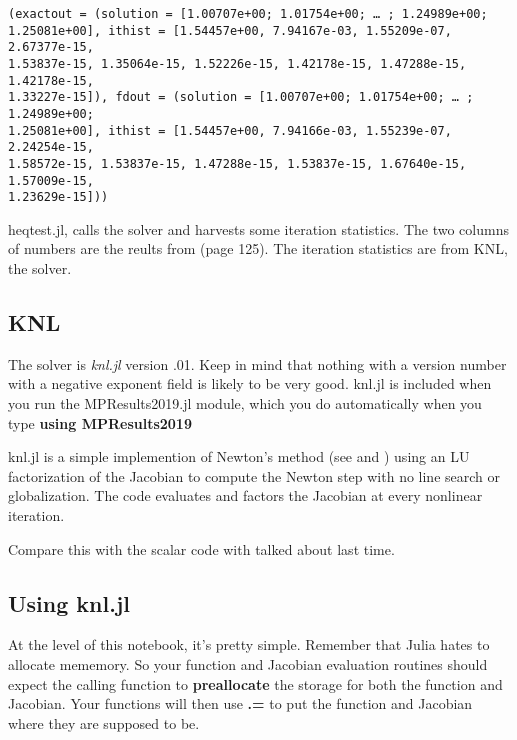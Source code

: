 \documentclass[11pt]{article}
\newcommand{\prompt}[4]{
        \llap{{\color{#2}[#3]: #4}}\vspace{-1.25em}
    }
\begin{document}
            \begin{tcolorbox}[breakable, boxrule=.5pt, size=fbox, pad at break*=1mm, opacityfill=0]
\prompt{Out}{outcolor}{9}{\hspace{3.5pt}}
\begin{Verbatim}[commandchars=\\\{\}]
(exactout = (solution = [1.00707e+00; 1.01754e+00; … ; 1.24989e+00;
1.25081e+00], ithist = [1.54457e+00, 7.94167e-03, 1.55209e-07, 2.67377e-15,
1.53837e-15, 1.35064e-15, 1.52226e-15, 1.42178e-15, 1.47288e-15, 1.42178e-15,
1.33227e-15]), fdout = (solution = [1.00707e+00; 1.01754e+00; … ; 1.24989e+00;
1.25081e+00], ithist = [1.54457e+00, 7.94166e-03, 1.55239e-07, 2.24254e-15,
1.58572e-15, 1.53837e-15, 1.47288e-15, 1.53837e-15, 1.67640e-15, 1.57009e-15,
1.23629e-15]))
\end{Verbatim}
\end{tcolorbox}
        
    heqtest.jl, calls the solver and harvests some iteration statistics. The
two columns of numbers are the reults from \cite{chand} (page 125). The
iteration statistics are from KNL, the solver.

    \hypertarget{knl}{%
\subsection{KNL}\label{knl}}

The solver is \emph{knl.jl} version .01. Keep in mind that nothing with
a version number with a negative exponent field is likely to be very
good. knl.jl is included when you run the MPResults2019.jl module, which
you do automatically when you type \textbf{using MPResults2019}

knl.jl is a simple implemention of Newton's method (see \cite{ctk:roots}
and \cite{ctk:newton} ) using an LU factorization of the Jacobian to
compute the Newton step with no line search or globalization. The code
evaluates and factors the Jacobian at every nonlinear iteration.

Compare this with the scalar code with talked about last time.

    \hypertarget{using-knl.jl}{%
\subsection{Using knl.jl}\label{using-knl.jl}}

At the level of this notebook, it's pretty simple. Remember that Julia
hates to allocate mememory. So your function and Jacobian evaluation
routines should expect the calling function to \textbf{preallocate} the
storage for both the function and Jacobian. Your functions will then use
\textbf{.=} to put the function and Jacobian where they are supposed to
be.
\end{document}
